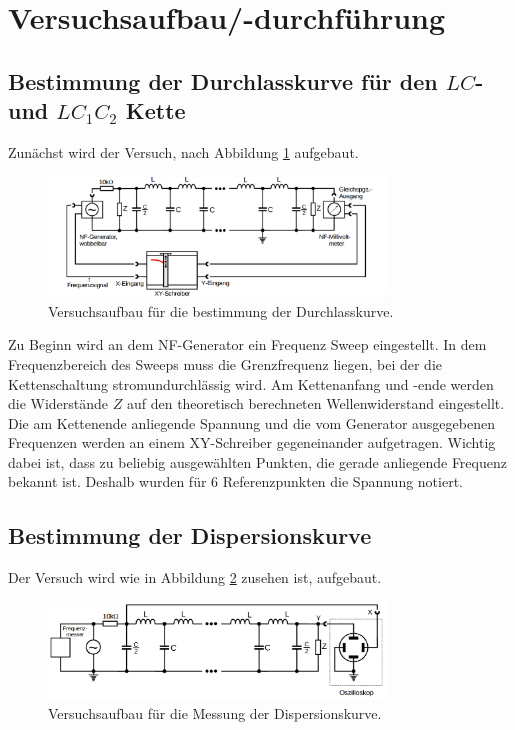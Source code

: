 \section{Versuchsaufbau/-durchführung}

\subsection{Bestimmung der Durchlasskurve für den $LC$- und $LC_1 C_2$ Kette}
Zunächst wird der Versuch, nach Abbildung \ref{fig:aufbau_durchlass} aufgebaut. %
\begin{figure}
  \centering
  \includegraphics[width=0.8\textwidth]{bilder/versuchsaufbau_1.png}
  \caption{Versuchsaufbau für die bestimmung der Durchlasskurve.\cite{anleitung356}}
  \label{fig:aufbau_durchlass}
\end{figure}

Zu Beginn wird an dem NF-Generator ein Frequenz Sweep eingestellt.
In dem Frequenzbereich des Sweeps muss die Grenzfrequenz liegen, bei der die
Kettenschaltung stromundurchlässig wird. %
Am Kettenanfang und -ende werden die Widerstände $Z$ auf den theoretisch
berechneten Wellenwiderstand eingestellt.
Die am Kettenende anliegende Spannung und die vom Generator ausgegebenen Frequenzen
werden an einem XY-Schreiber gegeneinander aufgetragen.
Wichtig dabei ist, dass zu beliebig ausgewählten Punkten, die gerade anliegende Frequenz bekannt ist.
Deshalb wurden für 6 Referenzpunkten die Spannung notiert.  %


\subsection{Bestimmung der Dispersionskurve}
Der Versuch wird wie in Abbildung \ref{fig:aufbau_dispersion} zusehen ist, aufgebaut.%
\begin{figure}
  \centering
  \includegraphics[width=0.8\textwidth]{bilder/versuchsaufbau_dispersion.png}
  \caption{Versuchsaufbau für die Messung der Dispersionskurve.\cite{anleitung356}}
  \label{fig:aufbau_dispersion}
\end{figure}

